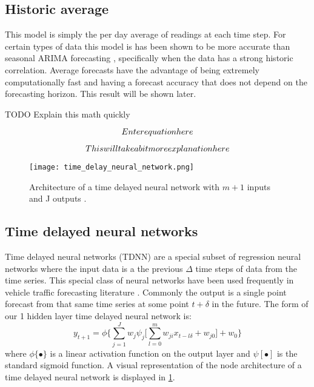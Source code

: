 \subsection{Historic average}
This model is simply the per day average of readings at each time step.  For certain types of data this model is has been shown to be more accurate than seasonal ARIMA forecasting \cite{Newsham2010}, specifically when the data has a strong historic correlation.  Average forecasts have the advantage of being extremely computationally fast and having a forecast accuracy that does not depend on the forecasting horizon.  This result will be shown later.

TODO Explain this math quickly

\begin{equation}
Enter equation here \\
\end{equation}

\begin{equation}
This will take a bit more explanation here \\
\end{equation}


\begin{figure}[!]
	\centering
		\texttt{[image: time\_delay\_neural\_network.png]}
		\caption{Architecture of a time delayed neural network with $m + 1$ inputs and J outputs \cite{Hansen2003}.}
	\label{fig:tdnnarch}
\end{figure}


\subsection{Time delayed neural networks}

Time delayed neural networks (TDNN) are a special subset of regression neural networks where the input data is a the previous $\Delta$ time steps of data from the time series.  This special class of neural networks have been used frequently in vehicle traffic forecasting literature \cite{Abdulhai1999, Ishak2003}.  Commonly the output is a single point forecast from that same time series at some point $t + \delta$ in the future.   The form of our 1 hidden layer time delayed neural network is:
\begin{equation}
y_{t + 1} = \phi \{ \sum_{j = 1}^{J} w_{j}\psi_{j} \bigg[ \sum_{l = 0}^{m}w_{ji}x_{t - l\delta} + w_{j0} \bigg] + w_0 \}
\end{equation}
\noindent where $\phi\{\bullet\}$ is a linear activation function on the output layer and $\psi[\bullet]$ is the standard sigmoid function.  A visual representation of the node architecture of a time delayed neural network is displayed in \ref{fig:tdnnarch}.


